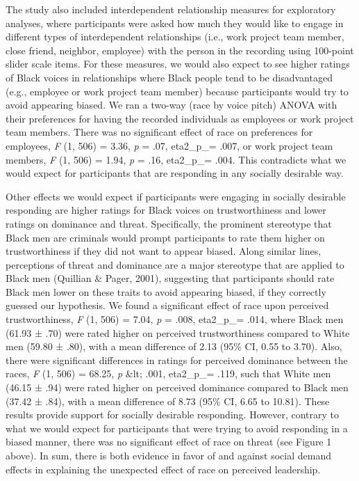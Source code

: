 \documentclass[
  english,
  man]{apa6}
\begin{document}
The study also included interdependent relationship measures for exploratory analyses, where participants were asked how much they would like to engage in different types of interdependent relationships (i.e., work project team member, close friend, neighbor, employee) with the person in the recording using 100-point slider scale items. For these measures, we would also expect to see higher ratings of Black voices in relationships where Black people tend to be disadvantaged (e.g., employee or work project team member) because participants would try to avoid appearing biased. We ran a two-way (race by voice pitch) ANOVA with their preferences for having the recorded individuals as employees or work project team members. There was no significant effect of race on preferences for employees, \emph{F} (1, 506) = 3.36, \emph{p} = .07, eta2\_p\_= .007, or work project team members, \emph{F} (1, 506) = 1.94, \emph{p} = .16, eta2\_p\_= .004. This contradicts what we would expect for participants that are responding in any socially desirable way.

Other effects we would expect if participants were engaging in socially desirable responding are higher ratings for Black voices on trustworthiness and lower ratings on dominance and threat. Specifically, the prominent stereotype that Black men are criminals would prompt participants to rate them higher on trustworthiness if they did not want to appear biased. Along similar lines, perceptions of threat and dominance are a major stereotype that are applied to Black men (Quillian \& Pager, 2001), suggesting that participants should rate Black men lower on these traits to avoid appearing biased, if they correctly guessed our hypothesis. We found a significant effect of race upon perceived trustworthiness, \emph{F} (1, 506) = 7.04, \emph{p} = .008, eta2\_p\_= .014, where Black men (61.93 ± .70) were rated higher on perceived trustworthiness compared to White men (59.80 ± .80), with a mean difference of 2.13 (95\% CI, 0.55 to 3.70). Also, there were significant differences in ratings for perceived dominance between the races, \emph{F} (1, 506) = 68.25, \emph{p} \&lt; .001, eta2\_p\_= .119, such that White men (46.15 ± .94) were rated higher on perceived dominance compared to Black men (37.42 ± .84), with a mean difference of 8.73 (95\% CI, 6.65 to 10.81). These results provide support for socially desirable responding. However, contrary to what we would expect for participants that were trying to avoid responding in a biased manner, there was no significant effect of race on threat (see Figure 1 above). In sum, there is both evidence in favor of and against social demand effects in explaining the unexpected effect of race on perceived leadership.
\end{document}
